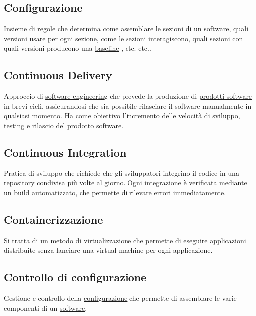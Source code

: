 	\subsection{Configurazione}
	\label{sec:configurazione}
	Insieme di regole che determina come assemblare le sezioni di un \underline{\hyperref[sec:prodottosoftware]{software}}, quali \underline{\hyperref[sec:versione]{versioni}} usare per ogni sezione, come le sezioni interagiscono, quali sezioni con quali versioni producono una \underline{\hyperref[sec:baseline]{baseline}} , etc. etc..

	\subsection{Continuous Delivery}
	\label{sec:continuousdelivery}
	Approccio di \underline{\hyperref[sec:swe]{software engineering}} che prevede la produzione di \underline{\hyperref[sec:prodottosoftware]{prodotti software}} in brevi cicli, assicurandosi che sia possibile rilasciare il software manualmente in qualsiasi momento. Ha come obiettivo l'incremento delle velocità di sviluppo, testing e rilascio del prodotto software.

	\subsection{Continuous Integration}
	\label{sec:continuousintegration}
	Pratica di sviluppo che richiede che gli sviluppatori integrino il codice in una \underline{\hyperref[sec:repo]{repository}} condivisa più volte al giorno. Ogni integrazione è verificata mediante un build automatizzato, che permette di rilevare errori immediatamente.

	\subsection{Containerizzazione}
	\label{sec:containerizzazione}
	Si tratta di un metodo di virtualizzazione che permette di eseguire applicazioni distribuite senza lanciare una virtual machine per ogni applicazione.

	\subsection{Controllo di configurazione}
	\label{sec:controlloconfigurazione}
	Gestione e controllo della \underline{\hyperref[sec:configurazione]{configurazione}} che permette di assemblare le varie componenti di un \underline{\hyperref[sec:prodottosoftware]{software}}.\newpage

